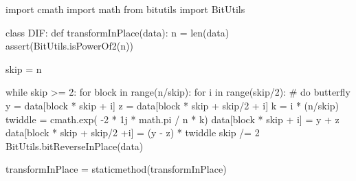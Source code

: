 \begin{python}
import cmath
import math
from bitutils import BitUtils

class DIF:
    def transformInPlace(data):
        n = len(data)
        assert(BitUtils.isPowerOf2(n))


        skip = n

        while skip >= 2:
            for block in range(n/skip):
                for i in range(skip/2):
                    # do butterfly
                    y = data[block * skip + i]
                    z = data[block * skip + skip/2 + i]
                    k = i * (n/skip)
                    twiddle = cmath.exp( -2 * 1j * math.pi / n * k)
                    data[block * skip + i] = y + z
                    data[block * skip + skip/2 +i] = (y - z) * twiddle
            skip /= 2
        BitUtils.bitReverseInPlace(data)


    transformInPlace = staticmethod(transformInPlace)
\end{python}
